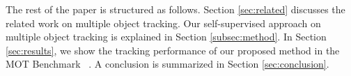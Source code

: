The rest of the paper is structured as follows. 
Section \ref{sec:related} discusses the related work on multiple object tracking. 
Our self-supervised approach on multiple object tracking is explained in Section \ref{subsec:method}. 
In Section \ref{sec:results}, we show the tracking performance of our proposed method in the MOT Benchmark ~\cite{MOT16}. %
A conclusion is summarized in Section \ref{sec:conclusion}.



